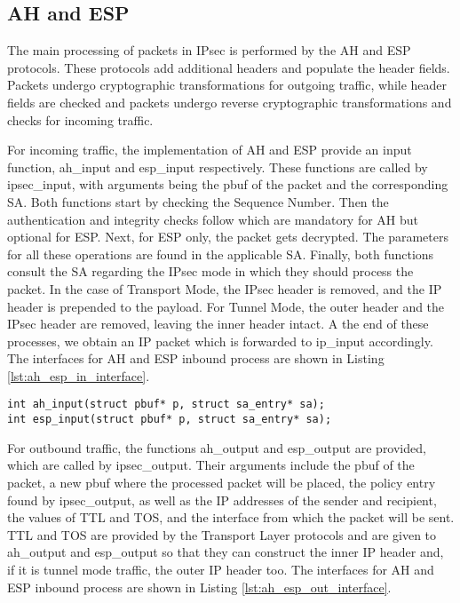 \subsection{AH and ESP}
The main processing of packets in IPsec is performed by the AH and ESP protocols. These protocols add additional headers and populate the header fields. Packets undergo cryptographic transformations for outgoing traffic, while header fields are checked and packets undergo reverse cryptographic transformations and checks for incoming traffic.

For incoming traffic, the implementation of AH and ESP provide an input function, ah\_input and esp\_input respectively. These functions are called by ipsec\_input, with arguments being the pbuf of the packet and the corresponding SA. Both functions start by checking the Sequence Number. Then the authentication and integrity checks follow which are mandatory for AH but optional for ESP. Next, for ESP only, the packet gets decrypted. The parameters for all these operations are found in the applicable SA. Finally, both functions consult the SA regarding the IPsec mode in which they should process the packet. In the case of Transport Mode, the IPsec header is removed, and the IP header is prepended to the payload. For Tunnel Mode, the outer header and the IPsec header are removed, leaving the inner header intact. A the end of these processes, we obtain an IP packet which is forwarded to ip\_input accordingly. The interfaces for AH and ESP inbound process are shown in Listing \ref{lst:ah_esp_in_interface}.\\

\noindent
\begin{minipage}{\linewidth}
\begin{lstlisting}[style=mycodestyle, label={lst:ah_esp_in_interface}, caption={AH and ESP inbound processing  interfaces}]
int ah_input(struct pbuf* p, struct sa_entry* sa);
int esp_input(struct pbuf* p, struct sa_entry* sa);
\end{lstlisting}
\end{minipage}

For outbound traffic, the functions ah\_output and esp\_output are provided, which are called by ipsec\_output. Their arguments include the pbuf of the packet, a new pbuf where the processed packet will be placed, the policy entry found by ipsec\_output, as well as the IP addresses of the sender and recipient, the values of TTL and TOS, and the interface from which the packet will be sent. TTL and TOS are provided by the Transport Layer protocols and are given to ah\_output and esp\_output so that they can construct the inner IP header and, if it is tunnel mode traffic, the outer IP header too. The interfaces for AH and ESP inbound process are shown in Listing \ref{lst:ah_esp_out_interface}.\\

